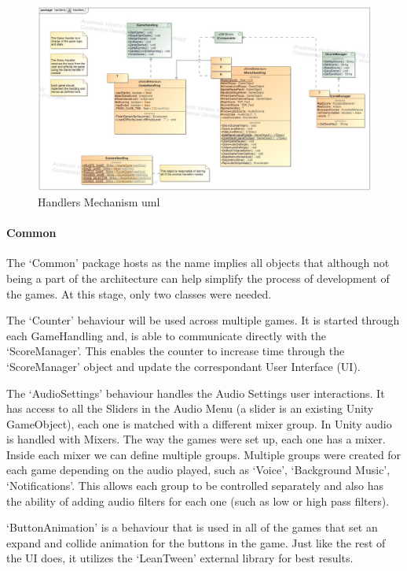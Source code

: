 \begin{figure}[H]
    \centering
    \includegraphics[width=\linewidth]{Chapters/new_architechture/class__handlers__Handlers.jpg}
    \caption{Handlers Mechanism \gls{uml}}
    \label{fig:handlers}
\end{figure}

\paragraph{Common}

The `Common' package hosts as the name implies all objects that although not being a part of the architecture can help simplify the process of development of the games. At this stage, only two classes were needed. 

The `Counter' behaviour will be used across multiple games. It is started through each GameHandling and, is able to communicate directly with the `ScoreManager'. This enables the counter to increase time through the `ScoreManager' object and update the correspondant User Interface (UI).

The `AudioSettings' behaviour handles the Audio Settings user interactions. It has access to all the Sliders in the Audio Menu (a slider is an existing Unity GameObject), each one is matched with a different mixer group. In Unity audio is handled with Mixers. The way the games were set up, each one has a mixer. Inside each mixer we can define multiple groups. Multiple groups were created for each game depending on the audio played, such as `Voice', `Background Music', `Notifications'. This allows each group to be controlled separately and also has the ability of adding audio filters for each one (such as low or high pass filters).

`ButtonAnimation' is a behaviour that is used in all of the games that set an expand and collide animation for the buttons in the game. Just like the rest of the UI does, it utilizes the `LeanTween' external library for best results.

